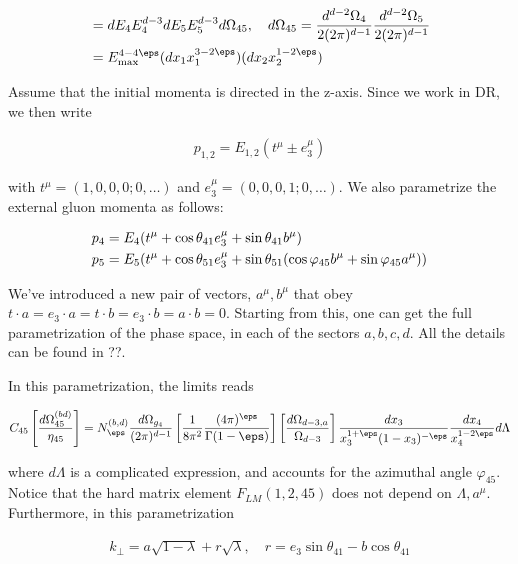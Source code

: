 \documentclass[11pt]{report}
\begin{document}
\begin{align}
    [dg_4][dg_5] &= dE_4 E_4^{d-3}dE_5 E_5^{d-3} d\Omega_{45}, \quad d\Omega_{45} = \frac{d^{d-2}\Omega_4}{2(2\pi)^{d-1}}\frac{d^{d-2}\Omega_5}{2(2\pi)^{d-1}} \notag \\ 
    &= E_{\max}^{4-4\eps}(dx_1 x_1^{3-2\eps})(dx_2 x_2^{1-2\eps})
\end{align}

Assume that the initial momenta is directed in the z-axis. Since we work in DR, we then write 

\begin{align}
    p_{1, 2} = E_{1, 2}(t^\mu \pm e_3^\mu)
\end{align}

with \(t^\mu = (1, 0, 0, 0; 0 ,\ldots)\) and \(e_3^\mu = (0, 0, 0, 1; 0, \ldots)\). We also parametrize the external gluon momenta as follows: 

\begin{align}
    &p_4 = E_4(t^\mu + \cos\theta_{41}e^\mu_3 +\sin\theta_{41}b^\mu) \notag \\ 
    &p_5 = E_5(t^\mu + \cos\theta_{51}e^\mu_3 +\sin\theta_{51}(\cos\varphi_{45}b^\mu+ \sin\varphi_{45}a^\mu))
\end{align}

We've introduced a new pair of vectors, \(a^\mu, b^\mu\) that obey \(t \cdot a = e_3 \cdot a = t \cdot b = e_3 \cdot b = a \cdot b = 0\). Starting from this, one can get the full parametrization of the phase space, in each of the sectors \(a, b, c, d\). All the details can be found in ??. 

In this parametrization, the limits reads 

\begin{align}
    C_{45}\left[ \frac{d\Omega_{45}^{(bd)}}{\eta_{45}} \right] = N_{\eps}^{(b, d)}\frac{d\Omega_{g_4}}{(2\pi)^{d-1}}\left[ \frac{1}{8\pi^2}\frac{(4\pi)^\eps}{\Gamma(1-\eps)} \right]\left[ \frac{d\Omega_{d-3, a}}{\Omega_{d-3}} \right]\frac{dx_3}{x_3^{1+\eps}(1-x_3)^{-\eps}}\frac{dx_4}{x_4^{1-2\eps}}d\Lambda
\end{align}

where \(d\Lambda\) is a complicated expression, and accounts for the azimuthal angle \(\varphi_{45}\). Notice that the hard matrix element \(F_{LM}(1, 2, 45)\) does not depend on \(\Lambda, a^\mu\). Furthermore, in this parametrization 

\begin{align}
    k_\perp = a\sqrt{1-\lambda} + r\sqrt{\lambda}, \quad r = e_3\sin\theta_{41} - b\cos\theta_{41}
\end{align}
\end{document}
